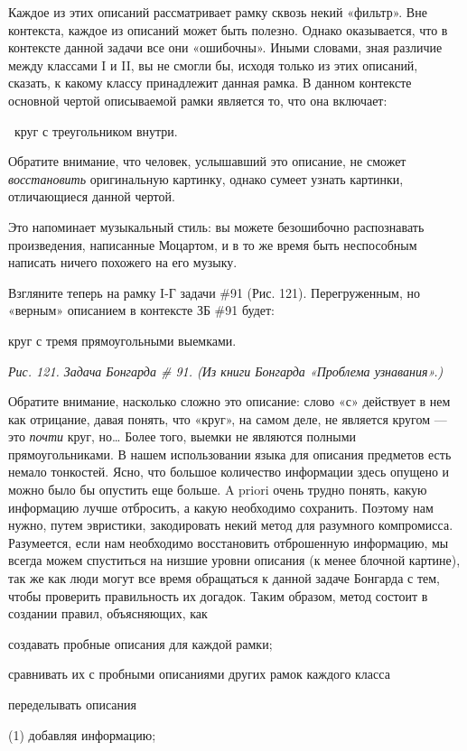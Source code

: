 \documentclass[../main.tex]{subfiles}
\begin{document}
Каждое из этих описаний рассматривает рамку сквозь некий «фильтр». Вне контекста, каждое из описаний может быть полезно. Однако оказывается, что в контексте данной задачи все они «ошибочны». Иными словами, зная различие между классами I и II, вы не смогли бы, исходя только из этих описаний, сказать, к какому классу принадлежит данная рамка. В данном контексте основной чертой описываемой рамки является то, что она включает:

~круг с треугольником внутри.

Обратите внимание, что человек, услышавший это описание, не сможет \emph{восстановить} оригинальную картинку, однако сумеет узнать картинки, отличающиеся данной чертой.

Это напоминает музыкальный стиль: вы можете безошибочно распознавать произведения, написанные Моцартом, и в то же время быть неспособным написать ничего похожего на его музыку.

Взгляните теперь на рамку I-Г задачи \#91 (Рис. 121). Перегруженным, но «верным» описанием в контексте ЗБ \#91 будет:

круг с тремя прямоугольными выемками.

\emph{Рис. 121. Задача Бонгарда \# 91. (Из книги Бонгарда «Проблема узнавания».)}

Обратите внимание, насколько сложно это описание: слово «с» действует в нем как отрицание, давая понять, что «круг», на самом деле, не является кругом --- это \emph{почти} круг, но\ldots{} Более того, выемки не являются полными прямоугольниками. В нашем использовании языка для описания предметов есть немало тонкостей. Ясно, что большое количество информации здесь опущено и можно было бы опустить еще больше. A priori очень трудно понять, какую информацию лучше отбросить, а какую необходимо сохранить. Поэтому нам нужно, путем эвристики, закодировать некий метод для разумного компромисса. Разумеется, если нам необходимо восстановить отброшенную информацию, мы всегда можем спуститься на низшие уровни описания (к менее блочной картине), так же как люди могут все время обращаться к данной задаче Бонгарда с тем, чтобы проверить правильность их догадок. Таким образом, метод состоит в создании правил, объясняющих, как

создавать пробные описания для каждой рамки;

сравнивать их с пробными описаниями других рамок каждого класса

переделывать описания

(1) добавляя информацию;
\end{document}
